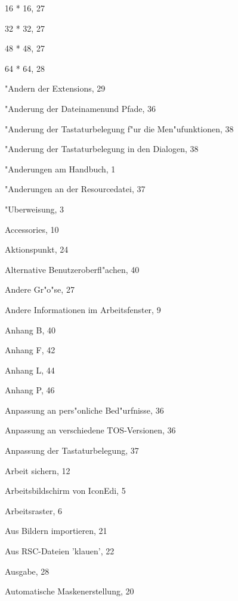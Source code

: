 \begin{theindex}

  \item 16 * 16, 27
  \item 32 * 32, 27
  \item 48 * 48, 27
  \item 64 * 64, 28

  \indexspace

  \item "Andern der Extensions, 29
  \item "Anderung der Dateinamenund Pfade, 36
  \item "Anderung der Tastaturbelegung f"ur die Men"ufunktionen, 38
  \item "Anderung der Tastaturbelegung in den Dialogen, 38
  \item "Anderungen am Handbuch, 1
  \item "Anderungen an der Resourcedatei, 37

  \indexspace

  \item "Uberweisung, 3

  \indexspace

  \item Accessories, 10
  \item Aktionspunkt, 24
  \item Alternative Benutzeroberfl"achen, 40
  \item Andere Gr"o"se, 27
  \item Andere Informationen im Arbeitsfenster, 9
  \item Anhang B, 40
  \item Anhang F, 42
  \item Anhang L, 44
  \item Anhang P, 46
  \item Anpassung an pers"onliche Bed"urfnisse, 36
  \item Anpassung an verschiedene TOS-Versionen, 36
  \item Anpassung der Tastaturbelegung, 37
  \item Arbeit sichern, 12
  \item Arbeitsbildschirm von IconEdi, 5
  \item Arbeitsraster, 6
  \item Aus Bildern importieren, 21
  \item Aus RSC-Dateien 'klauen', 22
  \item Ausgabe, 28
  \item Automatische Maskenerstellung, 20


\end{theindex}
